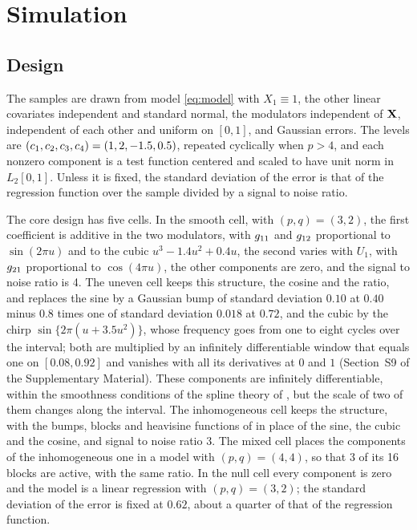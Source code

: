 \section{Simulation}
\label{sec:simulation}

\subsection{Design}
\label{sec:sim-design}

The samples are drawn from model \eqref{eq:model} with $X_1 \equiv 1$, the
other linear covariates independent and standard normal, the modulators
independent of $\mathbf{X}$, independent of each other and uniform on $[0,1]$, and
Gaussian errors. The levels are $(c_{1},c_{2},c_{3},c_{4}) =
(1, 2, -1.5, 0.5)$, repeated cyclically when $p > 4$, and each nonzero
component is a test function centered and scaled to have unit norm in
$L_2[0,1]$. Unless it is fixed, the standard deviation of the error is that of
the regression function over the sample divided by a signal to noise ratio.

The core design has five cells. In the smooth cell, with $(p,q) = (3,2)$, the
first coefficient is additive in the two modulators, with $g_{11}$ and
$g_{12}$ proportional to $\sin(2\pi u)$ and to the cubic
$u^{3} - 1.4u^{2} + 0.4u$, the second varies with $U_1$, with $g_{21}$
proportional to $\cos(4\pi u)$, the other components are zero, and the signal
to noise ratio is 4. The uneven cell keeps this structure, the cosine and the
ratio, and replaces the sine by a Gaussian bump of standard deviation $0.10$
at $0.40$ minus $0.8$ times one of standard deviation $0.018$ at $0.72$, and
the cubic by the chirp $\sin\{2\pi(u + 3.5u^{2})\}$, whose frequency goes from
one to eight cycles over the interval; both are multiplied by an infinitely
differentiable window that equals one on $[0.08, 0.92]$ and vanishes with all
its derivatives at $0$ and $1$ (Section~S9 of the Supplementary Material).
These components are infinitely differentiable, within the smoothness
conditions of the spline theory of \citet{Xue-Yang-2006}, but the scale of two
of them changes along the interval. The inhomogeneous cell keeps the
structure, with the bumps, blocks and heavisine functions of
\citet{Donoho-Johnstone-1994} in place of the sine, the cubic and the cosine,
and signal to noise ratio 3. The mixed cell places the components of the
inhomogeneous one in a model with $(p,q) = (4,4)$, so that 3 of its 16 blocks
are active, with the same ratio. In the null cell every component is zero and
the model is a linear regression with $(p,q) = (3,2)$; the standard deviation
of the error is fixed at $0.62$, about a quarter of that of the regression
function.

